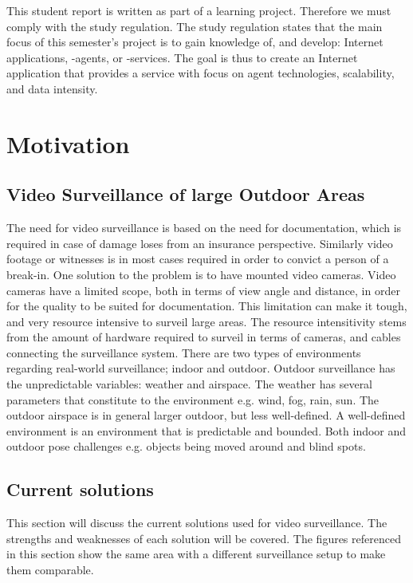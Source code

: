 This student report is written as part of a learning project. Therefore we must comply with the study regulation.
The study regulation states that the main focus of this semester's project is to gain knowledge of, and develop: Internet applications, -agents, or -services.
The goal is thus to create an Internet application that provides a service with focus on agent technologies, scalability, and data intensity.
\section{Motivation}

\subsection{Video Surveillance of large Outdoor Areas}
The need for video surveillance is based on the need for documentation, which is required in case of damage loses from an insurance perspective.
Similarly video footage or witnesses is in most cases required in order to convict a person of a break-in.
One solution to the problem is to have mounted video cameras.
Video cameras have a limited scope, both in terms of view angle and distance, in order for the quality to be suited for documentation.
This limitation can make it tough, and very resource intensive to surveil large areas.
The resource intensitivity stems from the amount of hardware required to surveil in terms of cameras, and cables connecting the surveillance system.
There are two types of environments regarding real-world surveillance; indoor and outdoor.
Outdoor surveillance has the unpredictable variables: weather and airspace.
The weather has several parameters that constitute to the environment e.g. wind, fog, rain, sun.
The outdoor airspace is in general larger outdoor, but less well-defined.
A well-defined environment is an environment that is predictable and bounded.
Both indoor and outdoor pose challenges e.g. objects being moved around and blind spots.

\subsection{Current solutions}
This section will discuss the current solutions used for video surveillance.
The strengths and weaknesses of each solution will be covered.
The figures referenced in this section show the same area with a different surveillance setup to make them comparable.
